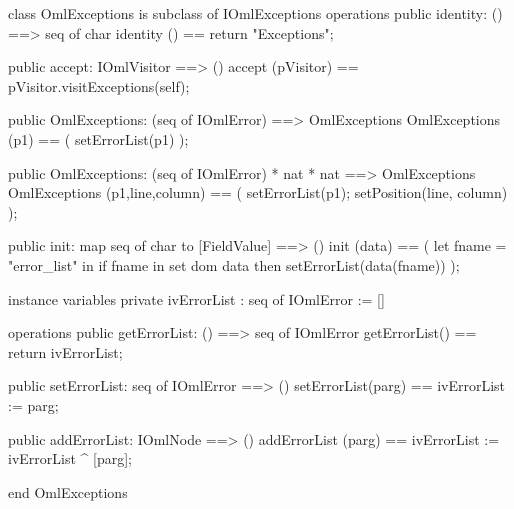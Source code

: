 \begin{vdm_al}
class OmlExceptions is subclass of IOmlExceptions
operations
  public identity: () ==> seq of char
  identity () == return "Exceptions";

  public accept: IOmlVisitor ==> ()
  accept (pVisitor) == pVisitor.visitExceptions(self);

  public OmlExceptions:
    (seq of IOmlError) ==> OmlExceptions
  OmlExceptions (p1) == 
    ( setErrorList(p1) );

  public OmlExceptions:
    (seq of IOmlError) *
    nat *
    nat ==> OmlExceptions
  OmlExceptions (p1,line,column) == 
    ( setErrorList(p1);
      setPosition(line, column) );

  public init: map seq of char to [FieldValue] ==> ()
  init (data) ==
    ( let fname = "error_list" in
        if fname in set dom data
        then setErrorList(data(fname)) );

instance variables
  private ivErrorList : seq of IOmlError := []

operations
  public getErrorList: () ==> seq of IOmlError
  getErrorList() == return ivErrorList;

  public setErrorList: seq of IOmlError ==> ()
  setErrorList(parg) == ivErrorList := parg;

  public addErrorList: IOmlNode ==> ()
  addErrorList (parg) == ivErrorList := ivErrorList ^ [parg];

end OmlExceptions
\end{vdm_al}


